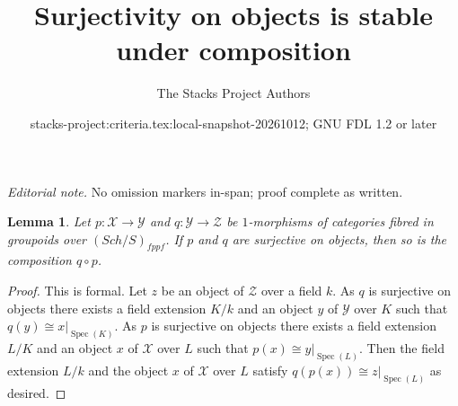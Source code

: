 \documentclass{stacks-project}
\title{Surjectivity on objects is stable under composition}
\author{The Stacks Project Authors}
\date{stacks-project:criteria.tex:local-snapshot-20261012; GNU FDL 1.2 or later}
\theoremstyle{plain}
\newtheorem{lemma}[subsection]{Lemma}
\theoremstyle{definition}
\theoremstyle{remark}
\numberwithin{equation}{subsection}
\def\Spec{\mathop{\mathrm{Spec}}}
\def\Sch{\mathit{Sch}}
\begin{document}
\maketitle
\noindent\textit{Editorial note.} No omission markers in-span; proof complete as written.\par\medskip
\begin{lemma}
\label{lemma-composition-surjective}
Let $p : \mathcal{X} \to \mathcal{Y}$ and $q : \mathcal{Y} \to \mathcal{Z}$
be $1$-morphisms of categories fibred in groupoids over $(\Sch/S)_{fppf}$.
If $p$ and $q$ are surjective on objects, then so is the composition
$q \circ p$.
\end{lemma}

\begin{proof}
This is formal. Let $z$ be an object of $\mathcal{Z}$ over a field $k$.
As $q$ is surjective on objects there exists a field extension $K/k$
and an object $y$ of $\mathcal{Y}$ over $K$ such that
$q(y) \cong x|_{\Spec(K)}$. As $p$ is surjective on objects there
exists a field extension $L/K$ and an object $x$ of $\mathcal{X}$
over $L$ such that $p(x) \cong y|_{\Spec(L)}$. Then the field extension
$L/k$ and the object $x$ of $\mathcal{X}$ over $L$ satisfy
$q(p(x)) \cong z|_{\Spec(L)}$ as desired.
\end{proof}
\end{document}
